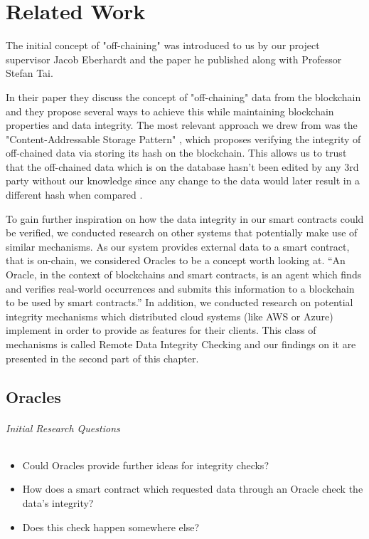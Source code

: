 \chapter{Related Work}
The initial concept of "off-chaining" was introduced to us by our project supervisor Jacob Eberhardt and the paper he published along with Professor Stefan Tai.

In their paper they discuss the concept of "off-chaining" data from the blockchain and they propose several ways to achieve this while maintaining blockchain properties and data integrity. The most relevant approach we drew from was the "Content-Addressable Storage Pattern" \cite{Eberhardt2017}, which proposes verifying the integrity of off-chained data via storing its hash on the blockchain. This allows us to trust that the off-chained data which is on the database hasn't been edited by any 3rd party without our knowledge since any change to the data would later result in a different hash when compared \cite{Eberhardt2017}.

To gain further inspiration on how the data integrity in our smart contracts could be verified, we conducted research on other systems that potentially make use of similar mechanisms. As our system provides external data to a smart contract, that is on-chain, we considered Oracles to be a concept worth looking at. “An Oracle, in the context of blockchains and smart contracts, is an agent which finds and verifies real-world occurrences and submits this information to a blockchain to be used by smart contracts.” \cite{relatedWork01} In addition, we conducted research on potential integrity mechanisms which distributed cloud systems (like AWS or Azure) implement in order to provide as features for their clients. This class of mechanisms is called Remote Data Integrity Checking and our findings on it are presented in the second part of this chapter.

\section{Oracles}

\subparagraph{Initial Research Questions}
\begin{itemize}
\item Could Oracles provide further ideas for integrity checks?
\item How does a smart contract which requested data through an Oracle check the data’s integrity?
\item Does this check happen somewhere else?
\end{itemize}

